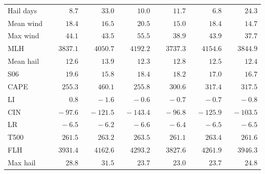 \documentclass[draft,grl]{agutexSI2019}\usepackage[]{graphicx}\usepackage[]{xcolor}
\begin{document}
\begin{article}
\begin{table}
\begin{tabular}{lcccccc}
Hail days  & $\phantom{000}\phantom{-}8.7$ & $\phantom{00}\phantom{-}33.0$ & $\phantom{00}\phantom{-}10.0$ & $\phantom{00}\phantom{-}11.7$ & $\phantom{000}\phantom{-}6.8$ & $\phantom{00}\phantom{-}24.3$ \\Mean wind  & $\phantom{00}\phantom{-}18.4$ & $\phantom{00}\phantom{-}16.5$ & $\phantom{00}\phantom{-}20.5$ & $\phantom{00}\phantom{-}15.0$ & $\phantom{00}\phantom{-}18.4$ & $\phantom{00}\phantom{-}14.7$ \\Max wind  & $\phantom{00}\phantom{-}44.1$ & $\phantom{00}\phantom{-}43.5$ & $\phantom{00}\phantom{-}55.5$ & $\phantom{00}\phantom{-}38.9$ & $\phantom{00}\phantom{-}43.9$ & $\phantom{00}\phantom{-}37.7$ \\MLH  & $\phantom{-}3837.1$ & $\phantom{-}4050.7$ & $\phantom{-}4192.2$ & $\phantom{-}3737.3$ & $\phantom{-}4154.6$ & $\phantom{-}3844.9$ \\Mean hail  & $\phantom{00}\phantom{-}12.6$ & $\phantom{00}\phantom{-}13.9$ & $\phantom{00}\phantom{-}12.3$ & $\phantom{00}\phantom{-}12.8$ & $\phantom{00}\phantom{-}12.5$ & $\phantom{00}\phantom{-}12.4$ \\S06  & $\phantom{00}\phantom{-}19.6$ & $\phantom{00}\phantom{-}15.8$ & $\phantom{00}\phantom{-}18.4$ & $\phantom{00}\phantom{-}18.2$ & $\phantom{00}\phantom{-}17.0$ & $\phantom{00}\phantom{-}16.7$ \\CAPE  & $\phantom{0}\phantom{-}255.3$ & $\phantom{0}\phantom{-}460.1$ & $\phantom{0}\phantom{-}255.8$ & $\phantom{0}\phantom{-}300.6$ & $\phantom{0}\phantom{-}317.4$ & $\phantom{0}\phantom{-}317.5$ \\LI  & $\phantom{000}\phantom{-}0.8$ & $\phantom{000}-1.6$ & $\phantom{000}-0.6$ & $\phantom{000}-0.7$ & $\phantom{000}-0.7$ & $\phantom{000}-0.8$ \\CIN  & $\phantom{00}-97.6$ & $\phantom{0}-121.5$ & $\phantom{0}-143.4$ & $\phantom{00}-96.8$ & $\phantom{0}-125.9$ & $\phantom{0}-103.5$ \\LR  & $\phantom{000}-6.5$ & $\phantom{000}-6.2$ & $\phantom{000}-6.6$ & $\phantom{000}-6.4$ & $\phantom{000}-6.5$ & $\phantom{000}-6.5$ \\T500  & $\phantom{0}\phantom{-}261.5$ & $\phantom{0}\phantom{-}263.2$ & $\phantom{0}\phantom{-}263.5$ & $\phantom{0}\phantom{-}261.1$ & $\phantom{0}\phantom{-}263.4$ & $\phantom{0}\phantom{-}261.6$ \\FLH  & $\phantom{-}3931.4$ & $\phantom{-}4162.6$ & $\phantom{-}4293.2$ & $\phantom{-}3827.6$ & $\phantom{-}4261.9$ & $\phantom{-}3946.3$ \\Max hail  & $\phantom{00}\phantom{-}28.8$ & $\phantom{00}\phantom{-}31.5$ & $\phantom{00}\phantom{-}23.7$ & $\phantom{00}\phantom{-}23.0$ & $\phantom{00}\phantom{-}23.7$ & $\phantom{00}\phantom{-}24.8$ \\
    \hline 
    \end{tabular}
\end{table}


\end{article}
\end{document}
